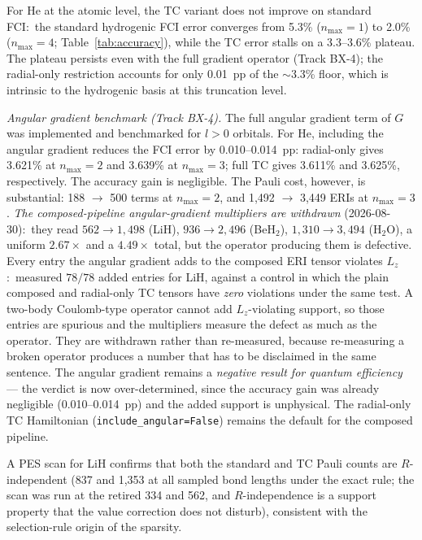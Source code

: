 \documentclass[aps,pra,twocolumn,superscriptaddress,longbibliography]{revtex4-2}
\begin{document}
For He at the atomic level, the TC variant does not improve on standard
FCI:\ the standard hydrogenic FCI error converges from
5.3\% ($n_{\max} = 1$) to 2.0\% ($n_{\max} = 4$;
Table~\ref{tab:accuracy}), while the TC error stalls on a
3.3--3.6\% plateau.  The plateau persists
even with the full gradient operator (Track BX-4); the
radial-only restriction accounts for only 0.01~pp of the
$\sim$3.3\% floor, which is intrinsic to the hydrogenic basis
at this truncation level.

\textit{Angular gradient benchmark (Track BX-4).}
The full angular gradient term of $G$ was implemented and benchmarked
for $l > 0$ orbitals.  For He, including the angular gradient reduces
the FCI error by 0.010--0.014~pp: radial-only gives 3.621\% at
$n_{\max} = 2$ and 3.639\% at $n_{\max} = 3$; full TC gives 3.611\%
and 3.625\%, respectively.  The accuracy gain is negligible.  The
Pauli cost, however, is substantial: 188 $\to$ 500 terms at
$n_{\max} = 2$, and 1{,}492 $\to$ 3{,}449 ERIs at $n_{\max} = 3$.
\emph{The composed-pipeline angular-gradient multipliers are withdrawn}
(2026-08-30):\ they read $562 \to 1{,}498$ (LiH), $936 \to 2{,}496$
(BeH$_2$), $1{,}310 \to 3{,}494$ (H$_2$O), a uniform $2.67\times$ and a
$4.49\times$ total, but the operator producing them is defective.  Every
entry the angular gradient adds to the composed ERI tensor violates
$L_z$:\ measured $78/78$ added entries for LiH, against a control in
which the plain composed and radial-only TC tensors have \emph{zero}
violations under the same test.  A two-body Coulomb-type operator cannot
add $L_z$-violating support, so those entries are spurious and the
multipliers measure the defect as much as the operator.  They are
withdrawn rather than re-measured, because re-measuring a broken operator
produces a number that has to be disclaimed in the same sentence.
The angular gradient remains a \emph{negative result for quantum
efficiency} --- the verdict is now over-determined, since the accuracy
gain was already negligible (0.010--0.014~pp) and the added support is
unphysical.  The radial-only TC Hamiltonian
(\texttt{include\_angular=False}) remains the default for the composed
pipeline.

A PES scan for LiH confirms that both the standard and TC Pauli
counts are $R$-independent (837 and 1{,}353 at all sampled bond lengths
under the exact rule; the scan was run at the retired 334 and 562, and
$R$-independence is a support property that the value correction does not
disturb),
consistent with the selection-rule origin of the sparsity.
\end{document}
